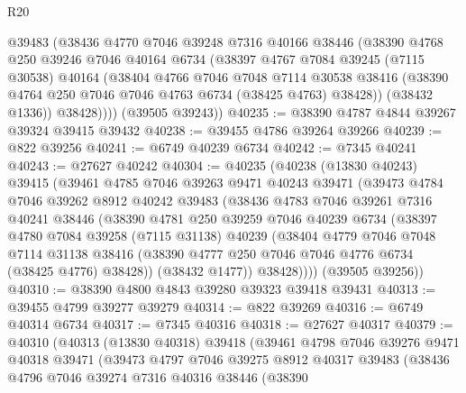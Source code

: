 \begin{lexlean}{R20}
\begin{coremodule}
{          @39483
          (@38436
            @4770
            @7046
            @39248
            @7316
            @40166
            @38446
            (@38390
              @4768
              @250
              @39246
              @7046
              @40164
              @6734
              (@38397
                @4767
                @7084
                @39245
                (@7115 @30538)
                @40164
                (@38404
                  @4766
                  @7046
                  @7048
                  @7114
                  @30538
                  @38416
                  (@38390 @4764 @250 @7046 @7046 @4763 @6734 (@38425 @4763) @38428))
                (@38432 @1336))
              @38428))))
      (@39505 @39243))
@40235 := @38390 @4787 @4844 @39267 @39324 @39415 @39432
@40238 := @39455 @4786 @39264 @39266
@40239 := @822 @39256
@40241 := @6749 @40239 @6734
@40242 := @7345 @40241
@40243 := @27627 @40242
@40304 := @40235
    (@40238
      (@13830 @40243)
      @39415
      (@39461
        @4785
        @7046
        @39263
        @9471
        @40243
        @39471
        (@39473
          @4784
          @7046
          @39262
          @8912
          @40242
          @39483
          (@38436
            @4783
            @7046
            @39261
            @7316
            @40241
            @38446
            (@38390
              @4781
              @250
              @39259
              @7046
              @40239
              @6734
              (@38397
                @4780
                @7084
                @39258
                (@7115 @31138)
                @40239
                (@38404
                  @4779
                  @7046
                  @7048
                  @7114
                  @31138
                  @38416
                  (@38390 @4777 @250 @7046 @7046 @4776 @6734 (@38425 @4776) @38428))
                (@38432 @1477))
              @38428))))
      (@39505 @39256))
@40310 := @38390 @4800 @4843 @39280 @39323 @39418 @39431
@40313 := @39455 @4799 @39277 @39279
@40314 := @822 @39269
@40316 := @6749 @40314 @6734
@40317 := @7345 @40316
@40318 := @27627 @40317
@40379 := @40310
    (@40313
      (@13830 @40318)
      @39418
      (@39461
        @4798
        @7046
        @39276
        @9471
        @40318
        @39471
        (@39473
          @4797
          @7046
          @39275
          @8912
          @40317
          @39483
          (@38436
            @4796
            @7046
            @39274
            @7316
            @40316
            @38446
            (@38390
}
\end{coremodule}
\end{lexlean}
